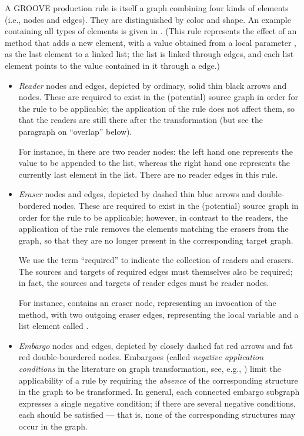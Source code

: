 A GROOVE production rule is itself a graph combining four kinds of elements
(i.e., nodes and edges). They are distinguished by color and shape. An example
containing all types of elements is given in . (This rule
represents the effect of an \Append{} method that adds a new element, with a
value obtained from a local parameter \xx{}, as the last element to a linked
list; the list is linked through \Next{} edges, and each list element points to
the value contained in it through a \Val{} edge.)
%
%
\begin{itemize}
\item \emph{Reader} nodes and edges, depicted by ordinary, solid thin black arrows
  and nodes. These are required to exist in the (potential) source graph in
  order for the rule to be applicable; the application of the rule does not
  affect them, so that the readers are still there after the transformation
  (but see the paragraph on ``overlap'' below).
  
  For instance, in  there are two reader nodes: the left hand one
  represents the value to be appended to the list, whereas the right hand one
  represents the currently last element in the list. There are no reader edges in
  this rule.
  
\item \emph{Eraser} nodes and edges, depicted by dashed thin blue arrows and
  double-bordered nodes. These are required to exist in the (potential) source
  graph in order for the rule to be applicable; however, in contrast to the
  readers, the application of the rule removes the elements matching the
  erasers from the graph, so that they are no longer present in the
  corresponding target graph.
  
  We use the term ``required'' to indicate the collection of
  readers and erasers. The sources and targets of required edges must
  themselves also be required; in fact, the sources and targets of reader edges
  must be reader nodes.

  For instance,  contains an eraser node, representing an
  invocation of the \Append{} method, with two outgoing eraser edges,
  representing the local variable \xx{} and a list element called \This.
  
\item \emph{Embargo} nodes and edges, depicted by closely dashed fat red arrows
  and fat red double-bourdered nodes. Embargoes (called \emph{negative
  application conditions} in the literature on graph transformation, see, e.g.,
  \cite{HabHecTae96}) limit the applicability of a rule by requiring the
  \emph{absence} of the corresponding structure in the graph to be transformed.
  In general, each connected embargo subgraph expresses a single negative
  condition; if there are several negative conditions, each should be satisfied
  --- that is, none of the corresponding structures may occur in the graph.
  

\end{itemize}
